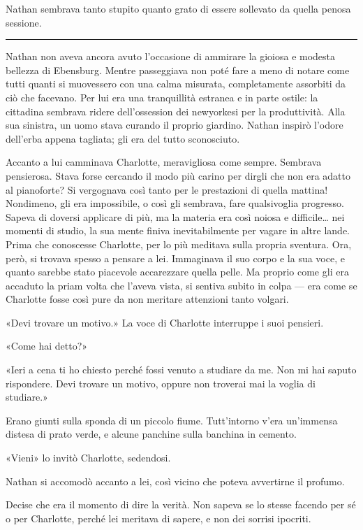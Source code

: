 \documentclass[a4paper,oneside,11pt]{memoir}
\begin{document}
Nathan sembrava tanto stupito quanto grato di essere sollevato da quella penosa sessione.

\plainbreak{1}

Nathan non aveva ancora avuto l'occasione di ammirare la gioiosa e modesta bellezza di Ebensburg. Mentre passeggiava non
poté fare a meno di notare come tutti quanti si muovessero con una calma misurata, completamente assorbiti da ciò che
facevano. Per lui era una tranquillità estranea e in parte ostile: la cittadina sembrava ridere dell'ossession dei
newyorkesi per la produttività. Alla sua sinistra, un uomo stava curando il proprio giardino. Nathan inspirò l'odore
dell'erba appena tagliata; gli era del tutto sconosciuto.

Accanto a lui camminava Charlotte, meravigliosa come sempre. Sembrava pensierosa. Stava forse cercando il modo più
carino per dirgli che non era adatto al pianoforte? Si vergognava così tanto per le prestazioni di quella mattina!
Nondimeno, gli era impossibile, o così gli sembrava, fare qualsivoglia progresso. Sapeva di doversi applicare di più, ma
la materia era così noiosa e difficile\dots{} nei momenti di studio, la sua mente finiva inevitabilmente per vagare in
altre lande. Prima che conoscesse Charlotte, per lo più meditava sulla propria sventura. Ora, però, si trovava spesso a
pensare a lei. Immaginava il suo corpo e la sua voce, e quanto sarebbe stato piacevole accarezzare quella pelle. Ma
proprio come gli era accaduto la priam volta che l'aveva vista, si sentiva subito in colpa --- era come se Charlotte
fosse così pure da non meritare attenzioni tanto volgari.

«Devi trovare un motivo.» La voce di Charlotte interruppe i suoi pensieri.

«Come hai detto?»

«Ieri a cena ti ho chiesto perché fossi venuto a studiare da me. Non mi hai saputo rispondere. Devi trovare un motivo,
oppure non troverai mai la voglia di studiare.»

Erano giunti sulla sponda di un piccolo fiume. Tutt'intorno v'era un'immensa distesa di prato verde, e alcune panchine
sulla banchina in cemento.

«Vieni» lo invitò Charlotte, sedendosi.

Nathan si accomodò accanto a lei, così vicino che poteva avvertirne il profumo.

Decise che era il momento di dire la verità. Non sapeva se lo stesse facendo per sé o per Charlotte, perché lei meritava
di sapere, e non dei sorrisi ipocriti.
\end{document}
